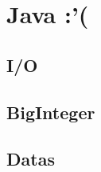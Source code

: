 \section{Java :'(}

\subsection{I/O}
\divisor

\subsection{BigInteger}
\divisor

\subsection{Datas}

